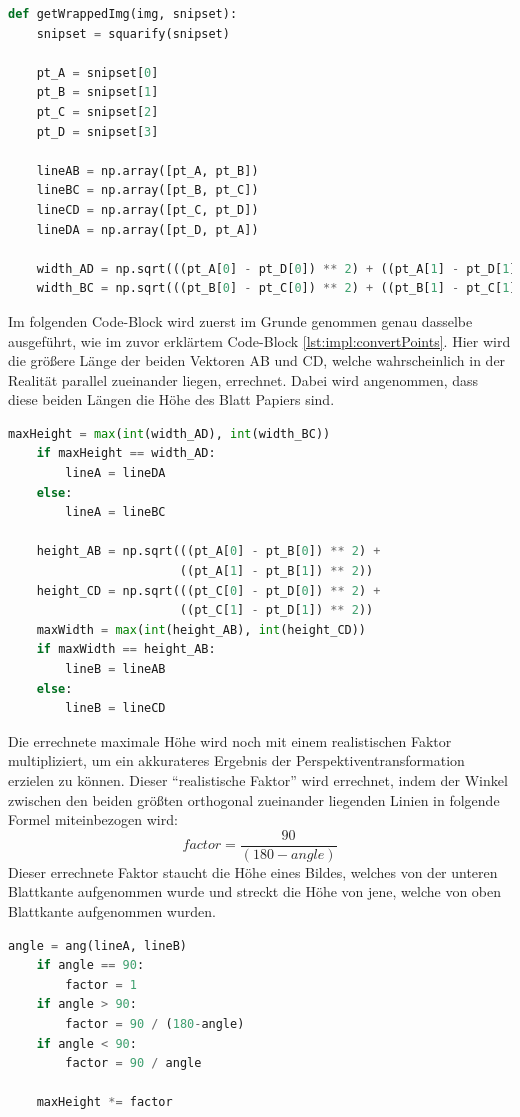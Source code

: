 \begin{lstlisting}[caption=Bild in Vogelperspektive umwandeln,language=Python,label=lst:impl:convertPoints]
def getWrappedImg(img, snipset):
    snipset = squarify(snipset)

    pt_A = snipset[0]
    pt_B = snipset[1]
    pt_C = snipset[2]
    pt_D = snipset[3]

    lineAB = np.array([pt_A, pt_B])
    lineBC = np.array([pt_B, pt_C])
    lineCD = np.array([pt_C, pt_D])
    lineDA = np.array([pt_D, pt_A])

    width_AD = np.sqrt(((pt_A[0] - pt_D[0]) ** 2) + ((pt_A[1] - pt_D[1]) ** 2))
    width_BC = np.sqrt(((pt_B[0] - pt_C[0]) ** 2) + ((pt_B[1] - pt_C[1]) ** 2))
\end{lstlisting}
Im folgenden Code-Block wird zuerst im Grunde genommen genau dasselbe ausgeführt, wie im zuvor erklärtem Code-Block \ref{lst:impl:convertPoints}. Hier wird die größere Länge der beiden Vektoren AB und CD, welche wahrscheinlich in der Realität parallel zueinander liegen, errechnet. Dabei wird angenommen, dass diese beiden Längen die Höhe des Blatt Papiers sind.
\begin{lstlisting}[language=Python,label=lst:impl:findBiggestLine,firstnumber=16]
    maxHeight = max(int(width_AD), int(width_BC))
    if maxHeight == width_AD:
        lineA = lineDA
    else:
        lineA = lineBC

    height_AB = np.sqrt(((pt_A[0] - pt_B[0]) ** 2) +
                        ((pt_A[1] - pt_B[1]) ** 2))
    height_CD = np.sqrt(((pt_C[0] - pt_D[0]) ** 2) +
                        ((pt_C[1] - pt_D[1]) ** 2))
    maxWidth = max(int(height_AB), int(height_CD))
    if maxWidth == height_AB:
        lineB = lineAB
    else:
        lineB = lineCD
\end{lstlisting}

Die errechnete maximale Höhe wird noch mit einem realistischen Faktor multipliziert, um ein akkurateres Ergebnis der Perspektiventransformation erzielen zu können. Dieser ``realistische Faktor'' wird errechnet, indem der Winkel zwischen den beiden größten orthogonal zueinander liegenden Linien in folgende Formel miteinbezogen wird:
\[ factor
  = \dfrac{90}{(180-angle)}
\]
Dieser errechnete Faktor staucht die Höhe eines Bildes, welches von der unteren Blattkante aufgenommen wurde und streckt die Höhe von jene, welche von oben Blattkante aufgenommen wurden.


\begin{lstlisting}[language=Python,label=lst:impl:angle,firstnumber=31]
    angle = ang(lineA, lineB)
    if angle == 90:
        factor = 1
    if angle > 90:
        factor = 90 / (180-angle)
    if angle < 90:
        factor = 90 / angle

    maxHeight *= factor
\end{lstlisting}

